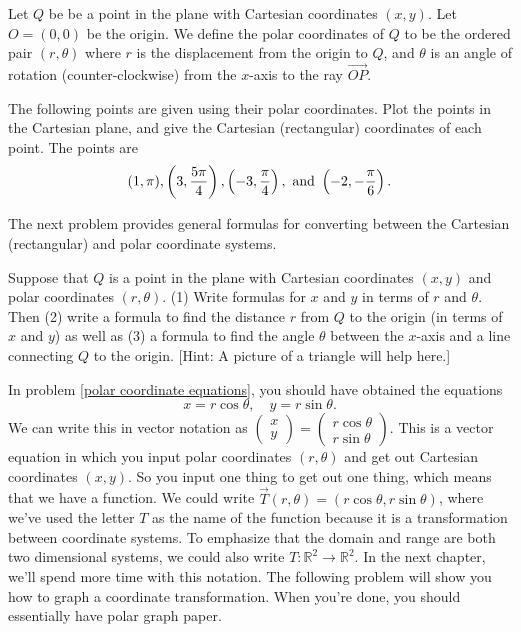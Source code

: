 \begin{definition}
Let $Q$ be be a point in the plane with Cartesian coordinates $(x,y)$.  Let $O=(0,0)$ be the origin. We define the polar coordinates of $Q$ to be the ordered pair $(r,\theta)$ where $r$ is the displacement from the origin to $Q$, and $\theta$ is an angle of rotation (counter-clockwise) from the $x$-axis to the ray $\vec {OP}$.
\end{definition}

\begin{problem}  
%
The following points are given using their polar coordinates.  Plot the points in the Cartesian plane, and give the Cartesian (rectangular) coordinates of each point. The points are
$$
(1,\pi), 
\displaystyle \left( 3,\frac{5\pi}{4}\right),
\displaystyle \left( -3,\frac{\pi}{4}\right),\text{ and }
\displaystyle \left( -2,-\frac{\pi}{6}\right).$$
\end{problem}

The next problem provides general formulas for converting between the Cartesian (rectangular) and polar coordinate systems.

\begin{problem}\label{polar coordinate equations}  
%
Suppose that $Q$ is a point in the plane with Cartesian coordinates $(x,y)$ and polar coordinates $(r,\theta)$.  (1) Write formulas for $x$ and $y$ in terms of $r$ and $\theta$.  
Then (2) write a formula to find the distance $r$ from $Q$ to the origin (in terms of $x$ and $y$) as well as (3) a formula to find the angle $\theta$ between the $x$-axis and a line connecting $Q$ to the origin. [Hint: A picture of a triangle will help here.]
\end{problem}
 
In problem \ref{polar coordinate equations}, you should have obtained the equations 
$$x=r\cos\theta, \quad y=r\sin\theta.$$
We can write this in vector notation as $\begin{pmatrix}x\\y\end{pmatrix}=\begin{pmatrix}r\cos\theta\\ r\sin\theta\end{pmatrix}$.
This is a vector equation in which you input polar coordinates $(r,\theta)$ and get out Cartesian coordinates $(x,y)$.  
So you input one thing to get out one thing, which means that we have a function.  
We could write $\vec T(r,\theta) = (r\cos\theta,r\sin\theta)$, where we've used the letter $T$ as the name of the function because it is a transformation between coordinate systems. 
To emphasize that the domain and range are both two dimensional systems, we could also write $T:\mathbb{R}^2\to\mathbb{R}^2$. In the next chapter, we'll spend more time with this notation. The following problem will show you how to graph a coordinate transformation.  When you're done, you should essentially have polar graph paper.

